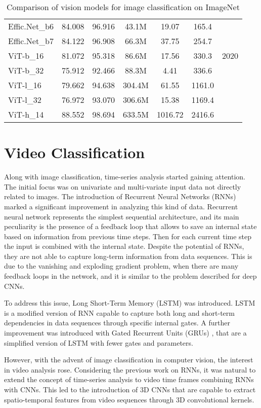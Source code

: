 \begin{table}[ht]
\begin{tabular}{l|c|c|c|c|c|c}
        Effic.Net\_b6 & 84.008 & 96.916 & 43.1M & 19.07 & 165.4 & \\
        Effic.Net\_b7 & 84.122 & 96.908 & 66.3M & 37.75 & 254.7 & \\
        \hline
        ViT-b\_16 & 81.072 & 95.318 & 86.6M & 17.56 & 330.3 & 2020 \\
        ViT-b\_32 & 75.912 & 92.466 & 88.3M & 4.41 & 336.6 & \\
        ViT-l\_16 & 79.662 & 94.638 & 304.4M & 61.55 & 1161.0 & \\
        ViT-l\_32 & 76.972 & 93.070 & 306.6M & 15.38 & 1169.4 & \\
        ViT-h\_14 & 88.552 & 98.694 & 633.5M & 1016.72 & 2416.6 & \\
        \hline
    \end{tabular}
    \caption{Comparison of vision models for image classification on ImageNet}
    \label{tab:cnn_comparison}
\end{table}


\section{Video Classification}
Along with image classification, time-series analysis started gaining attention. 
The initial focus was on univariate and multi-variate input 
data not directly related to images. 
The introduction of Recurrent Neural Networks (RNNs) \cite{rnn} marked a 
significant improvement in analyzing this kind of data. Recurrent neural 
network represents the simplest sequential architecture, and its main 
peculiarity is the presence of a feedback loop that allows to save an internal 
state based on information from previous time steps. Then for each current time 
step the input is combined with the internal state.
Despite the potential of RNNs, they are not able to capture long-term 
information from data sequences. This is due to the vanishing and exploding 
gradient problem, when there are many feedback loops in the network, and it is 
similar to the problem described for deep CNNs.

To address this issue, Long Short-Term Memory (LSTM) \cite{lstm} was introduced. 
LSTM is a modified version of RNN capable to capture both long and short-term 
dependencies in data sequences through specific internal gates. 
A further improvement was introduced with Gated Recurrent Units (GRUs) 
\cite{gru}, that are a simplified version of LSTM with fewer gates and 
parameters.

However, with the advent of image classification in computer vision, 
the interest in video analysis rose. Considering the previous work on RNNs, 
it was natural to extend the concept of time-series analysis to video time 
frames combining RNNs with CNNs. This led to the introduction of 3D CNNs that 
are capable to extract spatio-temporal features from video sequences through 
3D convolutional kernels.

